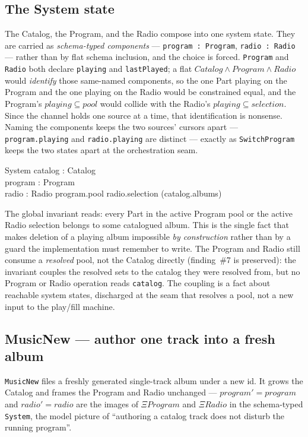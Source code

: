 \documentclass[a4paper,10pt,fleqn]{article}
\begin{document}
\subsection{The System state}
\label{sec:system}

The Catalog, the Program, and the Radio compose into one system state. They are
carried as \emph{schema-typed components} --- \texttt{program : Program},
\texttt{radio : Radio} --- rather than by flat schema inclusion, and the choice
is forced. \texttt{Program} and \texttt{Radio} both declare \texttt{playing} and
\texttt{lastPlayed}; a flat $Catalog \land Program \land Radio$ would
\emph{identify} those same-named components, so the one Part playing on the
Program and the one playing on the Radio would be constrained equal, and the
Program's $playing \subseteq pool$ would collide with the Radio's
$playing \subseteq selection$. Since the channel holds one source at a time,
that identification is nonsense. Naming the components keeps the two sources'
cursors apart --- \texttt{program.playing} and \texttt{radio.playing} are
distinct --- exactly as \texttt{SwitchProgram} keeps the two states apart at the
orchestration seam.

\begin{schema}{System}
  catalog : Catalog \\
  program : Program \\
  radio : Radio
  \where
  program.pool \cup radio.selection \subseteq \bigcup (\ran catalog.albums)
\end{schema}

The global invariant reads: every Part in the active Program pool or the active
Radio selection belongs to some catalogued album. This is the single fact that
makes deletion of a playing album impossible \emph{by construction} rather than
by a guard the implementation must remember to write. The Program and Radio
still consume a \emph{resolved} pool, not the Catalog directly (finding~\#7 is
preserved): the invariant couples the resolved sets to the catalog they were
resolved from, but no Program or Radio operation reads \texttt{catalog}. The
coupling is a fact about reachable system states, discharged at the seam that
resolves a pool, not a new input to the play/fill machine.

\subsection{MusicNew --- author one track into a fresh album}

\texttt{MusicNew} files a freshly generated single-track album under a new id. It
grows the Catalog and frames the Program and Radio unchanged
--- $program' = program$ and $radio' = radio$ are the images of \texttt{$\Xi
Program$} and \texttt{$\Xi Radio$} in the schema-typed \texttt{System}, the model
picture of ``authoring a catalog track does not disturb the running program''.
\end{document}
